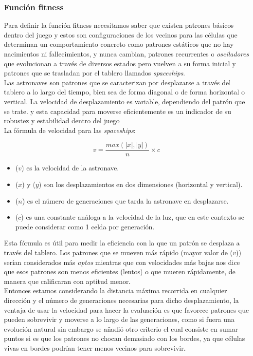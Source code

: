 \subsubsection*{Función fitness}

Para definir la función fitness necesitamos saber que existen patrones básicos dentro del 
juego y estos son configuraciones de los vecinos para las células que determinan un 
comportamiento concreto como patrones estáticos que no hay nacimientos ni fallecimientos,
y nunca cambian, patrones recurrentes o \textit{osciladores} que evolucionan a través de 
diversos estados pero vuelven a su forma inicial y patrones que se trasladan por el tablero
llamados \textit{spaceships}.\\ 

Las astronaves \cite{spaceships} son patrones que se caracterizan por desplazarse a través 
del tablero a lo largo del tiempo, bien sea de forma diagonal o de forma horizontal o 
vertical. La velocidad de desplazamiento es variable, dependiendo del patrón que se trate.
y esta capacidad para moverse eficientemente es un indicador de su robustez y estabilidad 
dentro del juego\\ 

\noindent La fórmula de velocidad para las \textit{spaceships}:

\begin{equation*}
    v = \frac{max(|x|,|y|)}{n} \times c
\end{equation*}

\begin{itemize}
    \item[] ($v$) es la velocidad de la astronave.
    \item[] ($x$) y ($y$) son los desplazamientos en dos dimensiones (horizontal y vertical).
    \item[] ($n$) es el número de generaciones que tarda la astronave en desplazarse.
    \item[] ($c$) es una constante análoga a la velocidad de la luz, que en este contexto se 
    puede considerar como 1 celda por generación.
\end{itemize}

Esta fórmula es útil para medir la eficiencia con la que un patrón se desplaza a través del 
tablero. Los patrones que se mueven más rápido (mayor valor de ($v$)) serían considerados 
más \textit{aptos} mientras que con velocidades más bajas nos dice que esos patrones son menos
eficientes (lentos) o que mueren rápidamente, de manera que calificaran con aptitud menor.\\    


Entonces estamos considerando la distancia máxima recorrida en cualquier dirección y el 
número de generaciones necesarias para dicho desplazamiento, la ventaja de usar la velocidad
para hacer la evaluación es que favorece patrones que pueden sobrevivir y moverse a lo largo de 
las generaciones, como si fuera una evolución natural sin embargo se añadió otro criterio el 
cual consiste en sumar puntos si es que los patrones no chocan demasiado con los bordes, ya que 
células vivas en bordes podrían tener menos vecinos para sobrevivir. 